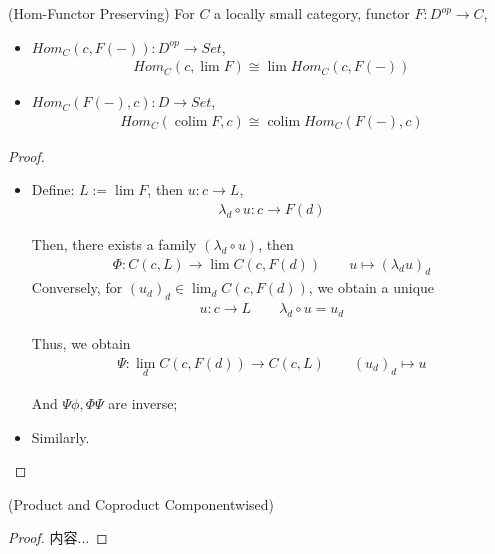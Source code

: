 \documentclass[Total.tex]{subfiles}
\begin{document}
					
					\begin{proposition}
						(Hom-Functor Preserving) For $C$ a locally small category, functor $F:D^{op}\rightarrow C$,
						\begin{itemize}
							\item $Hom_C(c,F(-)):D^{op}\rightarrow Set$,
							\begin{gather*}
								Hom_C(c,\lim F)\cong \lim Hom_C(c,F(-))
							\end{gather*}
							\item $Hom_C(F(-),c):D\rightarrow Set$,
							\begin{gather*}
								Hom_C(\operatorname{colim} F,c)\cong \operatorname{colim} Hom_C(F(-),c)
							\end{gather*}
						\end{itemize}
					\end{proposition}
					\begin{proof}
						\begin{itemize}
							\item Define: $L:=\lim F$, then $u:c\rightarrow L$, 
							\begin{gather*}
								\lambda_d\circ u:c\rightarrow F(d)
							\end{gather*}
							
							Then, there exists a family $(\lambda_d\circ u)$, then 
							\begin{gather*}
								\Phi:C(c,L)\rightarrow \lim C(c,F(d))\qquad u\mapsto (\lambda_d u)_d
							\end{gather*}
							Conversely, for $(u_d)_d\in \lim_d C(c,F(d))$, we obtain a unique 
							\begin{gather*}
								u:c\rightarrow L\qquad \lambda_d\circ u=u_d
							\end{gather*}
							
							Thus, we obtain
							\begin{gather*}
								\Psi:\lim_d C(c,F(d))\rightarrow C(c,L)\qquad (u_d)_d\mapsto u
							\end{gather*}
							
							
							And $\Psi\phi,\Phi\Psi$ are inverse;
							\item Similarly. 
						\end{itemize}
					\end{proof}
					
					\begin{proposition}
						(Product and Coproduct Componentwised)
					\end{proposition}
					\begin{proof}
						内容...
					\end{proof}
\end{document}
